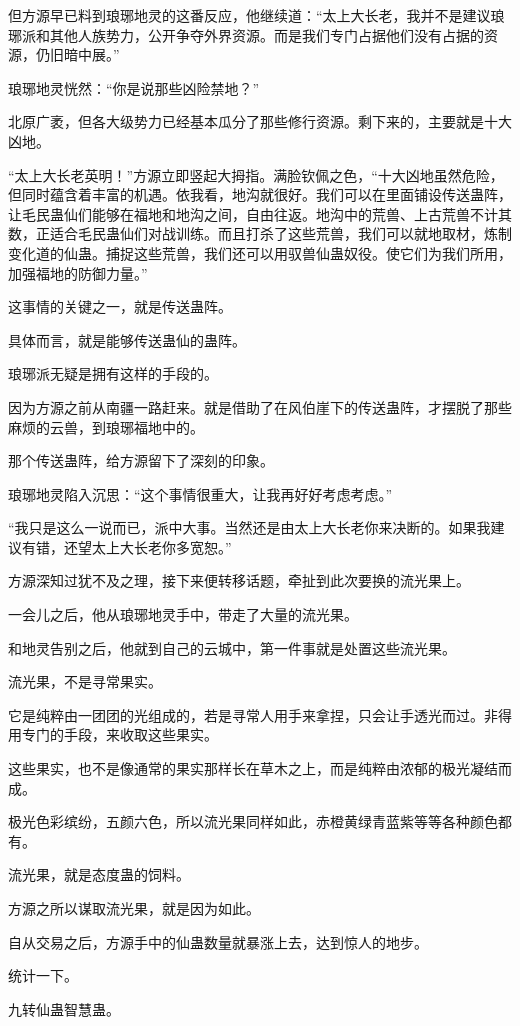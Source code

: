 \begin{this_body}
但方源早已料到琅琊地灵的这番反应，他继续道：“太上大长老，我并不是建议琅琊派和其他人族势力，公开争夺外界资源。而是我们专门占据他们没有占据的资源，仍旧暗中展。”

琅琊地灵恍然：“你是说那些凶险禁地？”

北原广袤，但各大级势力已经基本瓜分了那些修行资源。剩下来的，主要就是十大凶地。

“太上大长老英明！”方源立即竖起大拇指。满脸钦佩之色，“十大凶地虽然危险，但同时蕴含着丰富的机遇。依我看，地沟就很好。我们可以在里面铺设传送蛊阵，让毛民蛊仙们能够在福地和地沟之间，自由往返。地沟中的荒兽、上古荒兽不计其数，正适合毛民蛊仙们对战训练。而且打杀了这些荒兽，我们可以就地取材，炼制变化道的仙蛊。捕捉这些荒兽，我们还可以用驭兽仙蛊奴役。使它们为我们所用，加强福地的防御力量。”

这事情的关键之一，就是传送蛊阵。

具体而言，就是能够传送蛊仙的蛊阵。

琅琊派无疑是拥有这样的手段的。

因为方源之前从南疆一路赶来。就是借助了在风伯崖下的传送蛊阵，才摆脱了那些麻烦的云兽，到琅琊福地中的。

那个传送蛊阵，给方源留下了深刻的印象。

琅琊地灵陷入沉思：“这个事情很重大，让我再好好考虑考虑。”

“我只是这么一说而已，派中大事。当然还是由太上大长老你来决断的。如果我建议有错，还望太上大长老你多宽恕。”

方源深知过犹不及之理，接下来便转移话题，牵扯到此次要换的流光果上。

一会儿之后，他从琅琊地灵手中，带走了大量的流光果。

和地灵告别之后，他就到自己的云城中，第一件事就是处置这些流光果。

流光果，不是寻常果实。

它是纯粹由一团团的光组成的，若是寻常人用手来拿捏，只会让手透光而过。非得用专门的手段，来收取这些果实。

这些果实，也不是像通常的果实那样长在草木之上，而是纯粹由浓郁的极光凝结而成。

极光色彩缤纷，五颜六色，所以流光果同样如此，赤橙黄绿青蓝紫等等各种颜色都有。

流光果，就是态度蛊的饲料。

方源之所以谋取流光果，就是因为如此。

自从交易之后，方源手中的仙蛊数量就暴涨上去，达到惊人的地步。

统计一下。

九转仙蛊智慧蛊。


\end{this_body}
